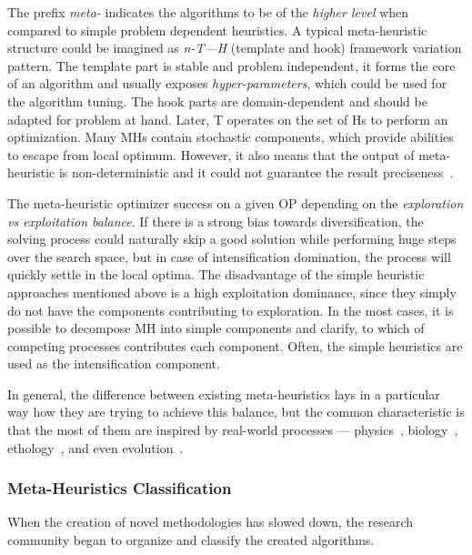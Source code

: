 The prefix \emph{meta-} indicates the algorithms to be of the \textit{higher level} when compared to simple problem dependent heuristics. A typical meta-heuristic structure could be imagined as \emph{n-T—H} (template and hook) framework variation pattern.  The template part is stable and problem independent, it forms the core of an algorithm and usually exposes \textit{hyper-parameters}, which could be used for the algorithm tuning. The hook parts are domain-dependent and should be adapted for problem at hand. Later, T operates on the set of Hs to perform an optimization.
Many MHs contain stochastic components, which provide abilities to escape from local optimum. However, it also means that the output of meta-heuristic is non-deterministic and it could not guarantee the result preciseness~\cite{boussaid2013survey}.

The meta-heuristic optimizer success on a given OP depending on the \textit{exploration vs exploitation balance}. If there is a strong bias towards diversification, the solving process could naturally skip a good solution while performing huge steps over the search space, but in case of intensification domination, the process will quickly settle in the local optima. The disadvantage of the simple heuristic approaches mentioned above is a high exploitation dominance, since they simply do not have the components contributing to exploration. In the most cases, it is possible to decompose MH into simple components and clarify, to which of competing processes contributes each component. Often, the simple heuristics are used as the intensification component.

In general, the difference between existing meta-heuristics lays in a particular way how they are trying to achieve this balance, but the common characteristic is that the most of them are inspired by real-world processes — physics~\cite{van1987simulated}, biology~\cite{sastry2005genetic}, ethology~\cite{teodorovic2006bee,dorigo2007ant,salcedo2014coral}, and even evolution~\cite{beyer2002evolution,eiben2015evolutionary}.


\subsubsection{Meta-Heuristics Classification}
When the creation of novel methodologies has slowed down, the research community began to organize and classify the created algorithms.

